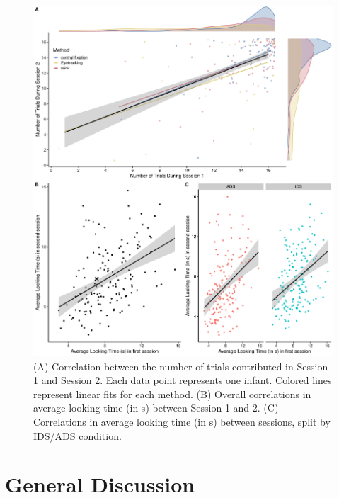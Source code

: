 \documentclass[
  english,
  man,floatsintext]{apa6}
\begin{document}
\begin{figure}

{\centering \includegraphics{Retest_current_draft_files/figure-latex/fig3-1} 

}

\caption{(A) Correlation between the number of trials contributed in Session 1 and Session 2. Each data point represents one infant. Colored lines represent linear fits for each method. (B) Overall correlations in average looking time (in s) between Session 1 and 2. (C) Correlations in average looking time (in s) between sessions, split by IDS/ADS condition.}\label{fig:fig3}
\end{figure}

\hypertarget{general-discussion}{%
\section{General Discussion}\label{general-discussion}}
\end{document}
